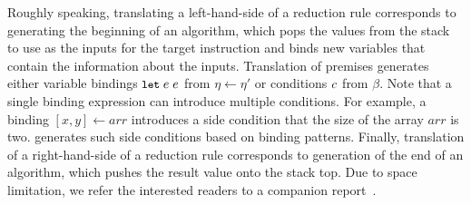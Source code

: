 Roughly speaking, translating a left-hand-side of a reduction rule corresponds to
generating the beginning of an algorithm, which pops the values from the stack
to use as the inputs for the target instruction and binds new variables
that contain the information about the inputs.
Translation of premises generates either variable bindings $\texttt{\small let} \; e \; e$
from $\eta \leftarrow \eta'$ or conditions $c$ from $\beta$.
Note that a single binding expression can introduce multiple conditions.
For example, a binding $[x, y] \leftarrow \mathit{arr}$ introduces a side condition
that the size of the array $\mathit{arr}$ is two.
\dltoil generates such side conditions based on binding patterns.
Finally, translation of a right-hand-side of a reduction rule corresponds to
generation of the end of an algorithm, which pushes the result value onto the stack top.
Due to space limitation, we refer the interested readers to a companion report~\cite{il-tr}.
